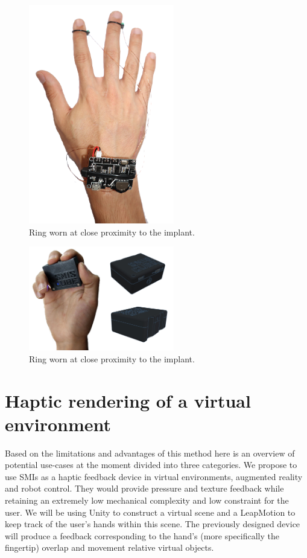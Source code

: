 \documentclass[10pt,journal,compsoc]{IEEEtran}
\begin{document}
\begin{figure}[!t]
		\centering
		\includegraphics[width=2.5in]{HandBluetooth}
		\caption{Ring worn at close proximity to the implant.}
		\label{HandBluetooth}
\end{figure}

\begin{figure}[!t]
		\centering
		\includegraphics[width=2.5in]{SMISCUBE}
		\caption{Ring worn at close proximity to the implant.}
		\label{SMISCUBE}
\end{figure}

\section{Haptic rendering of a virtual environment}
	Based on the limitations and advantages of this method here is an overview of potential use-cases at the moment divided into three categories. We propose to use SMIs as a haptic feedback device in virtual environments, augmented reality and robot control. They would provide pressure and texture feedback while retaining an extremely low mechanical complexity and low constraint for the user. We will be using Unity to construct a virtual scene and a LeapMotion to keep track of the user's hands within this scene. The previously designed device will produce a feedback corresponding to the hand's (more specifically the fingertip) overlap and movement relative virtual objects.
	
\end{document}
